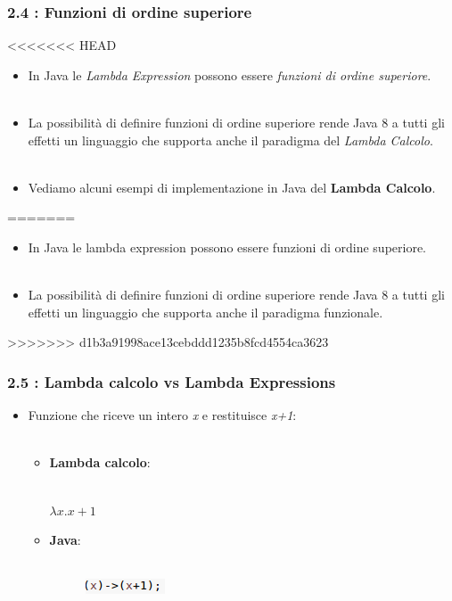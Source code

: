 \documentclass{beamer}
\begin{document}
\begin{frame}
	\frametitle{\textbf{2.4 : Funzioni di ordine superiore}}
<<<<<<< HEAD
	\begin{itemize}
		\item
			In Java le \textit{Lambda Expression} possono essere \textit{funzioni di ordine superiore}.\\\
		\item
			La possibilità di definire funzioni di ordine superiore rende Java 8 a tutti gli effetti un linguaggio che supporta anche il paradigma del \textit{Lambda Calcolo}.\\\	
		\item Vediamo alcuni esempi di implementazione in Java del \textbf{Lambda Calcolo}.
	\end{itemize}
=======
\begin{itemize}
	\item
	In Java le lambda expression possono essere funzioni di ordine superiore.\\\
	\item
	La possibilit\`a di definire funzioni di ordine superiore rende Java 8 a tutti gli effetti un linguaggio che supporta anche il paradigma funzionale.
\end{itemize}
>>>>>>> d1b3a91998ace13cebddd1235b8fcd4554ca3623
\end{frame}


\begin{frame}
	\frametitle{\textbf{2.5 : Lambda calcolo vs Lambda Expressions}}
	\begin{itemize}
		\item
			Funzione che riceve un intero \textit{x} e restituisce \textit{x+1}:\\\
		\begin{itemize}
			\item 
				\textbf{Lambda calcolo}:\\\
				\begin{center} 
					$\lambda x.x+1$ 
				\end{center}
			\item 
				\textbf{Java}:\\\
				\begin{figure}
					\centering
					\includegraphics[width=0.3\linewidth]{image/identity.png}
					\label{fig:identity}
				\end{figure}
		\end{itemize}
	\end{itemize}
\end{frame}
\end{document}
